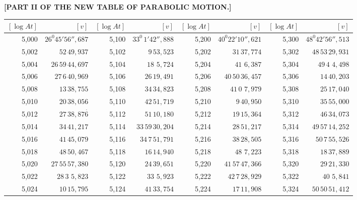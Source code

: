 \clearpage
{}
\begingroup
\centering
\fontsize{9}{9}\selectfont
\setlength{\tabcolsep}{1.25pt}
\renewcommand{\arraystretch}{.9}
\setlength{\parskip}{0pt}
\textbf{[PART II OF THE NEW TABLE OF PARABOLIC MOTION.]}
\par\vspace{7pt}
\begin{tabular}{|r|r||r|r||r|r||r|r|}
\hline
\([\log At]\) & \([v]\) & \([\log At]\) & \([v]\) & \([\log At]\) & \([v]\) & \([\log At]\) & \([v]\) \\
\hline
5,000 & \(26^{0}45'56'',\!687\) & 5,100 & \(33^{0}\,1'42'',\!888\) & 5,200 & \(40^{0}22'10'',\!621\) & 5,300 & \(48^{0}42'56'',\!513\) \\[1pt]
5,002 & \(52\,49,\!937\) & 5,102 & \(9\,53,\!523\) & 5,202 & \(31\,37,\!774\) & 5,302 & \(48\,53\,29,\!931\) \\
5,004 & \(26\,59\,44,\!697\) & 5,104 & \(18\,\,5,\!724\) & 5,204 & \(41\,\,6,\!387\) & 5,304 & \(49\,4\,\,4,\!498\) \\
5,006 & \(27\,6\,40,\!969\) & 5,106 & \(26\,19,\!491\) & 5,206 & \(40\,50\,36,\!457\) & 5,306 & \(14\,40,\!203\) \\
5,008 & \(13\,38,\!755\) & 5,108 & \(34\,34,\!823\) & 5,208 & \(41\,0\,\,7,\!979\) & 5,308 & \(25\,17,\!040\) \\[1pt]
5,010 & \(20\,38,\!056\) & 5,110 & \(42\,51,\!719\) & 5,210 & \(9\,40,\!950\) & 5,310 & \(35\,55,\!000\) \\[1pt]
5,012 & \(27\,38,\!87\overset{\cdot}{6}\) & 5,112 & \(51\,10,\!180\) & 5,212 & \(19\,15,\!364\) & 5,312 & \(46\,34,\!073\) \\
5,014 & \(34\,41,\!217\) & 5,114 & \(33\,59\,30,\!204\) & 5,214 & \(28\,51,\!217\) & 5,314 & \(49\,57\,14,\!252\) \\
5,016 & \(41\,45,\!079\) & 5,116 & \(34\,7\,51,\!791\) & 5,216 & \(38\,28,\!505\) & 5,316 & \(50\,7\,55,\!526\) \\
5,018 & \(48\,50,\!467\) & 5,118 & \(16\,14,\!940\) & 5,218 & \(48\,\,7,\!223\) & 5,318 & \(18\,37,\!889\) \\[1pt]
5,020 & \(27\,55\,57,\!380\) & 5,120 & \(24\,39,\!651\) & 5,220 & \(41\,57\,47,\!366\) & 5,320 & \(29\,21,\!330\) \\[1pt]
5,022 & \(28\,3\,\,5,\!823\) & 5,122 & \(33\,\,5,\!923\) & 5,222 & \(42\,7\,28,\!929\) & 5,322 & \(40\,\,5,\!841\) \\
5,024 & \(10\,15,\!795\) & 5,124 & \(41\,33,\!754\) & 5,224 & \(17\,11,\!908\) & 5,324 & \(50\,50\,51,\!412\) \\

\end{tabular}

